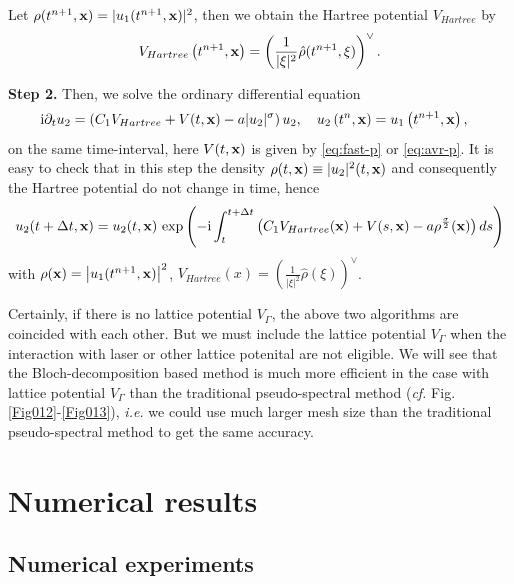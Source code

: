 \documentclass[10pt, leqno]{amsart}
\newcommand{\I}{\mathrm{i}}
\newcommand{\btu}{\Delta}
\newcommand{\sg}{\sigma}
\newcommand{\ie}{{\sl i.e.\/ }}
\newcommand{\cf}{{\sl cf.\/ }}
\newcommand{\dpm}{\displaystyle}
\newcommand{\xb}{\boldsymbol{\rm{x}}}
\def\({\left(}
\def\){\right)}
\begin{document}
Let $\rho(t^{n+1},\xb)=|u_1(t^{n+1},\xb)|^2$, then we obtain the Hartree potential $V_{Hartree}$ by
\[V_{Hartree}\(t^{n+1},\xb\)=\(\frac{1}{|\xi|^2}\hat{\rho}(t^{n+1}, \xi)\)^\vee.\]

\textbf{Step 2.} Then, we solve the ordinary differential equation
\begin{equation}
\label{bd2}
\begin{aligned}
& \,\I \partial _tu_2  = \left(C_1V_{Hartree}+V(t,\xb)-a|u_2|^\sg\right)u_2, \quad u_2\(t^{n},\xb\)=u_1\(t^{n+1},\xb\),
\end{aligned}
\end{equation}
on the same time-interval, here $V(t,\xb)$ is given by \eqref{eq:fast-p} or \eqref{eq:avr-p}.
It is easy to check that  in this step the density $\rho(t,\xb)\equiv|u_2|^2(t,\xb)$ and consequently the Hartree potential do not change in time, hence
\[ u_2(t+\btu t,\xb)=u_2(t,\xb)\,\exp\({\dpm-\I \int_{t}^{t+\btu t}
\(C_1V_{Hartree}(\xb)+V(s,\xb)-a\rho^\frac{\sg}{2}(\xb)\) ds}\)
\] with $\rho(\xb)=\left|u_1(t^{n+1},\xb)\right|^2$, $V_{Hartree}(x)=\(\frac{1}{|\xi|^2}\hat{\rho}(\xi)\)^\vee$.


\begin{remark} Certainly, if there is no lattice potential $V_\Gamma$, the above two algorithms are coincided with each other.
But we must include the lattice potential $V_\Gamma$ when the interaction with laser or other lattice potenital are not eligible.
We will see that the Bloch-decomposition based method is much more efficient in the case with lattice potential $V_\Gamma$
than the traditional pseudo-spectral method (\cf Fig. \ref{Fig012}-\ref{Fig013}), \ie we could use much larger mesh size
than the traditional pseudo-spectral method to get the same accuracy.
\end{remark}
\section{Numerical results}






\subsection{Numerical experiments}

%
\end{document}
